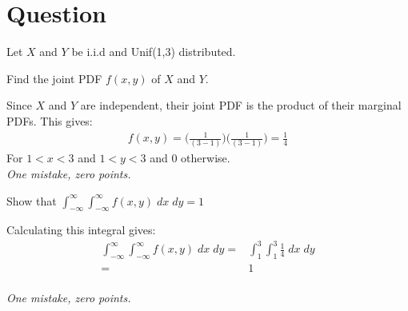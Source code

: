 \section*{Question}

Let $X$ and $Y$ be i.i.d and Unif(1,3) distributed.
\begin{exercise}[0.5]
Find the joint PDF $f(x,y)$ of $X$ and $Y$.
\begin{solution}
    Since $X$ and $Y$ are independent, their joint PDF is the product of their marginal PDFs. This gives:
    \begin{align*}
        f(x,y) = \Big(\frac{1}{(3-1)}\Big) \Big(\frac{1}{(3-1)}\Big) = \frac{1}{4}
    \end{align*}
    For $1<x<3$ and $1<y<3$ and 0 otherwise. \\
    \textit{One mistake, zero points.}
\end{solution}
\end{exercise}

\begin{exercise}[0.5]
Show that $\int_{-\infty}^\infty \int_{-\infty}^\infty f(x,y) \; dx \; dy = 1$
\begin{solution}
    Calculating this integral gives:
    \begin{align*}
      \int_{-\infty}^\infty \int_{-\infty}^\infty f(x,y) \; dx \; dy =& \int_1^3 \int_1^3
      \frac{1}{4} \; dx \; dy \\
      =& 1
    \end{align*} \\
    \textit{One mistake, zero points.}
\end{solution}
\end{exercise}

